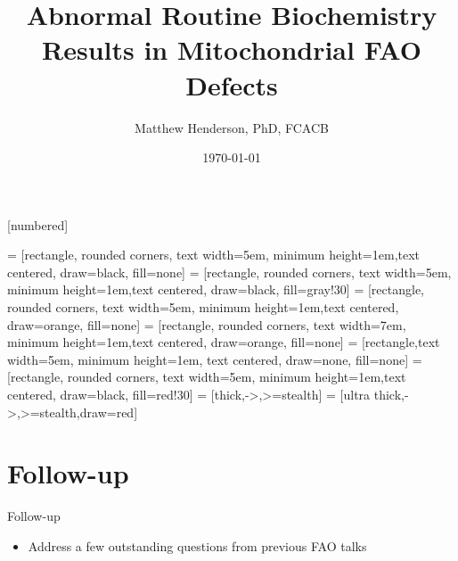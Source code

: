 \documentclass[presentation, smaller]{beamer}
\author{Matthew Henderson, PhD, FCACB}
\date{\today}
\title{Abnormal Routine Biochemistry Results in Mitochondrial FAO Defects}
\institute[NSO]{Newborn Screening Ontario | The University of Ottawa}
\begin{document}
\maketitle

\vspace{220pt}
\beamertemplatenavigationsymbolsempty
{}[numbered]

 = [rectangle, rounded corners, text width=5em, minimum height=1em,text centered, draw=black, fill=none]
 = [rectangle, rounded corners, text width=5em, minimum height=1em,text centered, draw=black, fill=gray!30]
 = [rectangle, rounded corners, text width=5em, minimum height=1em,text centered, draw=orange, fill=none]
 = [rectangle, rounded corners, text width=7em, minimum height=1em,text centered, draw=orange, fill=none]
 = [rectangle,text width=5em, minimum height=1em, text centered, draw=none, fill=none]
 = [rectangle, rounded corners, text width=5em, minimum height=1em,text centered, draw=black, fill=red!30]
 = [thick,->,>=stealth]
 = [ultra thick,->,>=stealth,draw=red]

\section{Follow-up}
\label{sec:orgheadline8}
\begin{frame}[label={sec:orgheadline1}]{Follow-up}
\begin{itemize}
\item Address a few outstanding questions from previous FAO talks
\end{itemize}
\end{frame}
\end{document}
